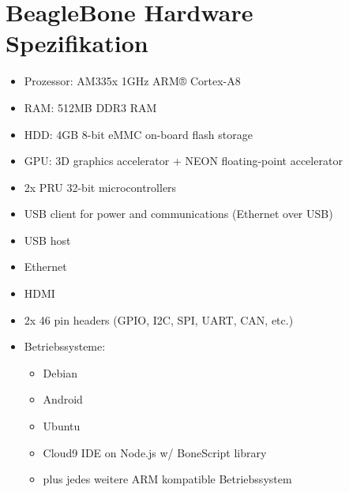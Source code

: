 \chapter{BeagleBone Hardware Spezifikation}
\begin{itemize}
	\itemsep 1pt \parskip 0pt \parsep 0pt
	\item Prozessor:	AM335x 1GHz ARM® Cortex-A8
	\item RAM:			512MB DDR3 RAM
	\item HDD:			4GB 8-bit eMMC on-board flash storage
	\item GPU:  		3D graphics accelerator + NEON floating-point accelerator
	\item 2x PRU 32-bit microcontrollers
	\item USB client for power and communications (Ethernet over USB)
	\item USB host
	\item Ethernet
	\item HDMI
	\item 2x 46 pin headers (GPIO, I2C, SPI, UART, CAN, etc.)
	\item Betriebssysteme:
	\begin{itemize}
		\itemsep 1pt \parskip 0pt \parsep 0pt
		\item Debian
		\item Android
		\item Ubuntu
		\item Cloud9 IDE on Node.js w/ BoneScript library
		\item plus jedes weitere ARM kompatible Betriebssystem
	\end{itemize}		
\end{itemize}

